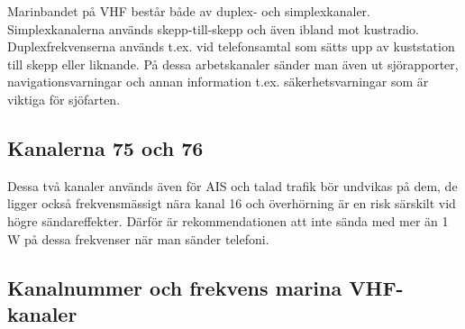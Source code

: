 Marinbandet på VHF består både av duplex- och simplexkanaler. Simplexkanalerna
används skepp-till-skepp och även ibland mot kustradio. Duplexfrekvenserna
används t.ex. vid telefonsamtal som sätts upp av kuststation till skepp eller
liknande. På dessa arbetskanaler sänder man även ut sjörapporter,
navigationsvarningar och annan information t.ex. säkerhetsvarningar som är
viktiga för sjöfarten.

\subsection{Kanalerna 75 och 76}

Dessa två kanaler används även för AIS och talad trafik bör undvikas på dem, de
ligger också frekvensmässigt nära kanal 16 och överhörning är en risk särskilt
vid högre sändareffekter. Därför är rekommendationen att inte sända med mer än
1\,W på dessa frekvenser när man sänder telefoni.

\subsection{Kanalnummer och frekvens marina VHF-kanaler}

